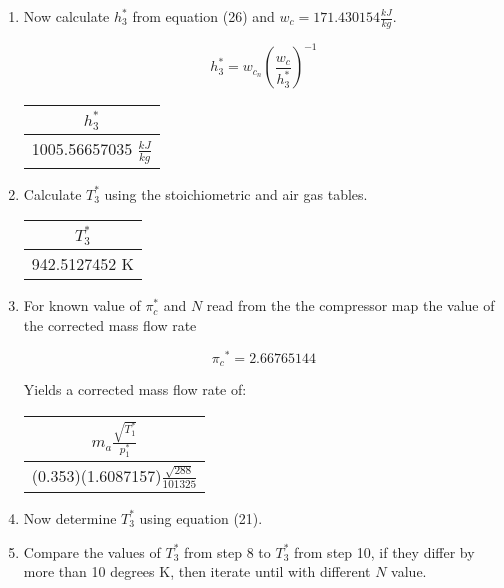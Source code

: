 \documentclass[titlepage]{article}
\begin{document}
\begin{enumerate}
  \item Now calculate $h_{3}^{*}$ from equation (26) and $w_{c} = 171.430154 \frac{kJ}{kg}$.
  
  \begin{equation}
    h_{3}^{*} = w_{c_{n}} \left( \frac{w_{c}}{h_{3}^{*}}\right)^{-1}
  \end{equation}

  \begin{center}
    \begin{tabular}{|c|}
      \hline
      $h_{3}^{*}$ \\
      \hline
      1005.56657035 $\frac{kJ}{kg}$ \\
      \hline
    \end{tabular}
  \end{center}

  \item Calculate $T_{3}^{*}$ using the stoichiometric and air gas tables. 
  
  \begin{center}
    \begin{tabular}{|c|}
      \hline
      $T_{3}^{*}$ \\
      \hline
      942.5127452 K \\
      \hline
    \end{tabular}
  \end{center}

  \item For known value of $\pi_{c}^{*}$ and $N$ read from the the compressor map the value of the corrected mass flow rate

  \begin{equation}
    \pi{_c}^{*} = 2.66765144
  \end{equation}

  Yields a corrected mass flow rate of:

  \begin{center}
    \begin{tabular}{|c|}
      \hline
      $m_{a}\frac{\sqrt{T_{1}^{*}}}{p_{1}^{*}}$ \\
      \hline
      (0.353)(1.6087157)$\frac{\sqrt{288}}{101325}$ \\
      \hline
    \end{tabular}
  \end{center}

  \item Now determine $T_{3}^{*}$ using equation (21).
  \item Compare the values of $T_{3}^{*}$ from step 8 to $T_{3}^{*}$ from step 10, if they differ by more than 10 degrees K, then iterate until with different $N$ value.
  

\end{enumerate}
\end{document}

